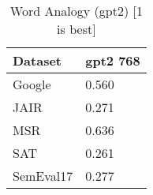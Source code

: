 \begin{table}[]
\centering
\begin{tabular}{l|l}
\hline
Dataset & gpt2 768 \\
\hline
Google & 0.560 \\ 
JAIR & 0.271 \\ 
MSR & 0.636 \\ 
SAT & 0.261 \\ 
SemEval17 & 0.277
\end{tabular}
\caption{Word Analogy (gpt2) [1 is best]}
\label{tab:analogy-gpt2}
\end{table}

